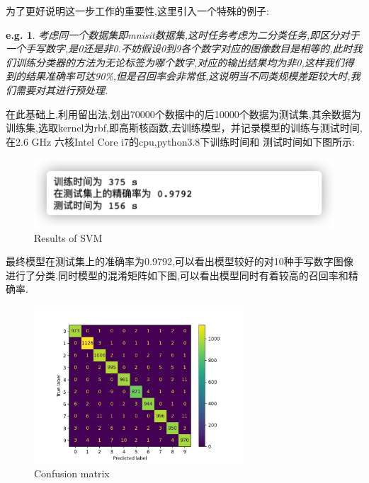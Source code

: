 \documentclass[UTF8,a4paper,11pt]{ctexart}
\newtheorem{ex}{e.g.}
\begin{document}
为了更好说明这一步工作的重要性,这里引入一个特殊的例子:
\begin{ex}
	考虑同一个数据集即mnisit数据集,这时任务考虑为二分类任务,即区分对于一个手写数字,是0还是非0.不妨假设0到9各个数字对应的图像数目是相等的,此时我们训练分类器的方法为无论标签为哪个数字,对应的输出结果均为非0,这样我们得到的结果准确率可达90\%,但是召回率会非常低,这说明当不同类规模差距较大时,我们需要对其进行预处理.
\end{ex}
\par 在此基础上,利用留出法,划出70000个数据中的后10000个数据为测试集,其余数据为训练集,选取kernel为rbf,即高斯核函数,去训练模型，并记录模型的训练与测试时间,在2.6 GHz 六核Intel Core i7的cpu,python3.8下训练时间和 测试时间如下图所示:
\begin{figure}[H]
	\centering
	\includegraphics[width=1.0\textwidth,height=0.2\textwidth]{SVM_result.png}
	\caption{Results of SVM}
\end{figure}
\par 最终模型在测试集上的准确率为0.9792,可以看出模型较好的对10种手写数字图像进行了分类.同时模型的混淆矩阵如下图,可以看出模型同时有着较高的召回率和精确率.
\begin{figure}[H]
	\centering
	\includegraphics[width=0.7\textwidth,height=0.5\textwidth]{cm.png}
	\caption{Confusion matrix}
\end{figure}
\end{document}

